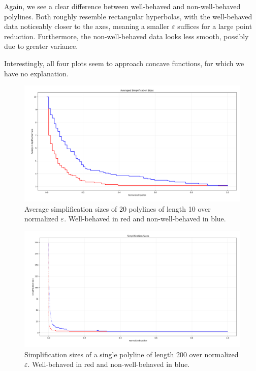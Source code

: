 Again, we see a clear difference between well-behaved and non-well-behaved polylines. Both roughly resemble rectangular hyperbolas, with the well-behaved data noticeably closer to the axes, meaning a smaller \(\varepsilon\) suffices for a large point reduction. Furthermore, the non-well-behaved data looks less smooth, possibly due to greater variance.

Interestingly, all four plots seem to approach concave functions, for which we have no explanation.

\begin{figure}[b]
  \centering
	\includegraphics[scale=0.4]{./figures/vary_e10.png}
  \caption{Average simplification sizes of 20 polylines of length 10 over normalized \(\varepsilon\). Well-behaved in red and non-well-behaved in blue.}
  \label{fig:vary_e10}
\end{figure}

\begin{figure}[b]
  \centering
	\includegraphics[scale=0.4]{./figures/vary_e200.png}
  \caption{Simplification sizes of a single polyline of length 200 over normalized \(\varepsilon\). Well-behaved in red and non-well-behaved in blue.}
  \label{fig:vary_e200}
\end{figure}

